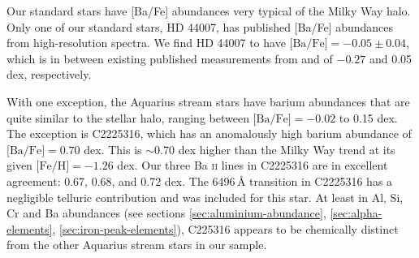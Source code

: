 \documentclass{emulateapj}
\begin{document}
Our standard stars have [Ba/Fe] abundances very typical of the Milky Way halo. Only one of our standard stars, HD 44007, has published [Ba/Fe] abundances from high-resolution spectra. We find HD 44007 to have $\mbox{[Ba/Fe]} = -0.05 \pm 0.04$, which is in between existing published measurements from \citet{fulbright_2000} and \citet{burris;et-al_2000} of $-0.27$ and 0.05 dex, respectively. 

With one exception, the Aquarius stream stars have barium abundances that are quite similar to the stellar halo, ranging between $\mbox{[Ba/Fe]} = -0.02$ to 0.15 dex. The exception is C2225316, which has an anomalously high barium abundance of $\mbox{[Ba/Fe]} = 0.70$ dex. This is ${\sim}$0.70 dex higher than the Milky Way trend at its given $\mbox{[Fe/H]} = -1.26$ dex. Our three Ba \textsc{ii} lines in C2225316 are in excellent agreement: 0.67, 0.68, and 0.72 dex. The 6496\,{\AA} transition in C2225316 has a negligible telluric contribution and was included for this star. At least in Al, Si, Cr and Ba abundances (see sections \ref{sec:aluminium-abundance}, \ref{sec:alpha-elements}, \ref{sec:iron-peak-elements}), C225316 appears to be chemically distinct from the other Aquarius stream stars in our sample. 
\end{document}
